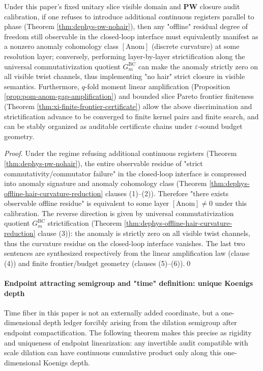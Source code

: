 \begin{corollary}\label{cor:dephys-offline-hair-iff-curvature}
Under this paper's fixed unitary slice visible domain and \(\mathbf{PW}\) closure audit calibration, if one refuses to introduce additional continuous registers parallel to phase (Theorem \ref{thm:dephys-pw-nohair}), then any "offline" residual degree of freedom still observable in the closed-loop interface must equivalently manifest as a nonzero anomaly cohomology class \([\mathrm{Anom}]\) (discrete curvature) at some resolution layer; conversely, performing layer-by-layer strictification along the universal commutativization quotient \(G^{\mathrm{BC}}_m\) can make the anomaly strictly zero on all visible twist channels, thus implementing "no hair" strict closure in visible semantics.
Furthermore, \(q\)-fold moment linear amplification (Proposition \ref{prop:pom-anom-gap-amplification}) and bounded slice Pareto frontier finiteness (Theorem \ref{thm:xi-finite-frontier-certificate}) allow the above discrimination and strictification advance to be converged to finite kernel pairs and finite search, and can be stably organized as auditable certificate chains under \(\varepsilon\)-sound budget geometry.
\end{corollary}

\begin{proof}
Under the regime refusing additional continuous registers (Theorem \ref{thm:dephys-pw-nohair}), the entire observable residue of "strict commutativity/commutator failure" in the closed-loop interface is compressed into anomaly signature and anomaly cohomology class (Theorem \ref{thm:dephys-offline-hair-curvature-reduction} clauses (1)–(2)). Therefore "there exists observable offline residue" is equivalent to some layer \([\mathrm{Anom}]\neq 0\) under this calibration. The reverse direction is given by universal commutativization quotient \(G^{\mathrm{BC}}_m\) strictification (Theorem \ref{thm:dephys-offline-hair-curvature-reduction} clause (3)): the anomaly is strictly zero on all visible twist channels, thus the curvature residue on the closed-loop interface vanishes. The last two sentences are synthesized respectively from the linear amplification law (clause (4)) and finite frontier/budget geometry (clauses (5)–(6)).\qed
\end{proof}

\paragraph{Endpoint attracting semigroup and "time" definition: unique Koenigs depth}
Time fiber in this paper is not an externally added coordinate, but a one-dimensional depth ledger forcibly arising from the dilation semigroup after endpoint compactification.
The following theorem makes this precise as rigidity and uniqueness of endpoint linearization: any invertible audit compatible with scale dilation can have continuous cumulative product only along this one-dimensional Koenigs depth.

